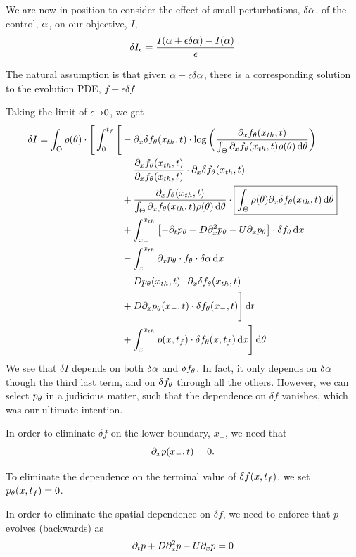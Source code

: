 \documentclass{article}
\begin{document}
We are now in position to consider the effect of small
perturbations, $\delta {\alpha}$, of the control, ${\alpha}$, on our objective, $I$,
$$
\delta I_\epsilon =\frac{I({\alpha} + \epsilon \delta {\alpha}) - I({\alpha})}{{\epsilon}}
$$

The natural assumption is that given ${\alpha} +  \epsilon \delta {\alpha}$, there is a
corresponding solution to the evolution PDE, $f+ \epsilon \delta f$

Taking the limit of $\epsilon{\rightarrow}0$, we get
\begin{equation}
\begin{aligned}
\delta I =  
\int_\Theta  \rho({\theta})\cdot\Bigg[ \int_0^{{t_f}} \Bigg[ 
&-   {\partial}_x \delta f_{\theta}({ x_{th} }, t)  \cdot 
		\log \left( \frac{{\partial}_xf_{\theta}({ x_{th} }, t)}
						{\int_\Theta {\partial}_xf_{\theta}({ x_{th} }, t)\rho({\theta})\, \mathrm{d} {\theta} } \right)
\\ 
	&-  \frac{ {\partial}_x f_{\theta}({ x_{th} }, t)}{ {\partial}_x f_{\theta}({ x_{th} }, t)}  \cdot {\partial}_x
		\delta f_{\theta}({ x_{th} }, t)
\\ 
	&+    \frac{ {\partial}_x f_{\theta}({ x_{th} }, t)}{	{\int_\Theta {\partial}_xf_{\theta}({ x_{th} },
	t)\rho({\theta})\, \mathrm{d} {\theta} }} \cdot
		 \boxed{\int_\Theta \rho({\theta}) {\partial}_x \delta f_{\theta}({ x_{th} }, t) 	\, \mathrm{d} {\theta}}				 
\\
 &+ \int_{x_-}^{{ x_{th} }} 
	\left[-{\partial}_tp_{\theta} +  D{\partial}^2_xp_{\theta}  - U {\partial}_xp_{\theta} \right]\cdot  \delta f_{\theta}
\, \mathrm{d} x
\\ & - \int_{x_-}^{{ x_{th} }}
{\partial}_xp_{\theta} \cdot f_{\theta}\cdot \delta {\alpha} \, \mathrm{d} x
\\
 &-   D p_{\theta}({ x_{th} },t) \cdot {\partial}_x\delta f_{\theta}({ x_{th} },t) 
\\
 &+  D{\partial}_xp_{\theta}(x_-,t) \cdot\delta f_{\theta}(x_-,t)
  \Bigg]			 \, \mathrm{d} t	
\\
&+\int_{x_-}^{{ x_{th} }} p(x, {t_f}) \cdot \delta f_{\theta}(x, {t_f}) \, \mathrm{d} x  
   \Bigg]\, \mathrm{d} {\theta}	   
\end{aligned} 
\label{eq:differential_I_before_refactoring}
\end{equation}
We see that $\delta I$ depends on both $\delta {\alpha}$ and $\delta f_{\theta}$. 
In fact, it only depends on $\delta {\alpha}$ though the third last term, and on
$\delta f_{\theta}$ through all the others.
However, we can select $p_{\theta}$ in a judicious matter, such that the
dependence on $\delta f$ vanishes, which was our ultimate intention.

In order to eliminate $\delta f$ on the lower boundary,
$x_-$, we need that $$ {\partial}_xp(x_-,t)=0.$$

To eliminate the dependence on the terminal value of $\delta f(x, {t_f})$, we set
$p_{\theta}(x, {t_f})=0$.

In order to eliminate the spatial dependence on $\delta f$, we need to
enforce that $p$ evolves (backwards) as $${\partial}_t p + D{\partial}_x^2p - U {\partial}_x p = 0$$
\end{document}
